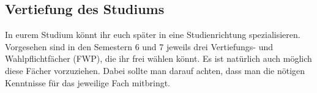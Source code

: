 \subsection{Vertiefung des Studiums}
In eurem Studium könnt ihr euch später in eine Studienrichtung 
spezialisieren. Vorgesehen sind in den Semestern 6 und 7 jeweils drei 
Vertiefungs- und Wahlpflichtfächer (FWP), die ihr frei wählen könnt. Es 
ist natürlich auch möglich diese Fächer vorzuziehen. Dabei sollte man 
darauf achten, dass man die nötigen Kenntnisse für das jeweilige Fach 
mitbringt. 